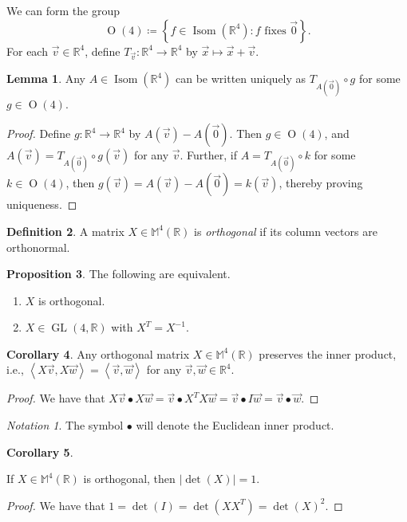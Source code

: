 \documentclass[10pt,letterpaper,cm]{nupset}
\theoremstyle{definition}
\newtheorem{definition}{Definition}[section]
\theoremstyle{theorem}
\newtheorem{lemma}[definition]{Lemma}
\newtheorem{cor}[definition]{Corollary}
\newtheorem{prop}[definition]{Proposition}
\theoremstyle{remark}
\newtheorem*{notation}{Notation}
\newcommand{\M}{\mathbb M}
\newcommand{\R}{\mathbb R}
\newcommand{\1}{\mathbf{1}}
\renewcommand{\v}{\vec v}
\newcommand{\w}{\vec w}
\newcommand{\x}{\vec x}
\newcommand{\0}{\vec {0}}
\DeclareMathOperator{\ORT}{O}
\DeclareMathOperator{\Isom}{Isom}
\DeclareMathOperator{\GL}{GL}
\begin{document}
We can form the group $$\ORT(4)\coloneqq \left\{f\in  \Isom(\R^4): f \text{ fixes } \0\right\}.$$ For each $\v\in \R^4$, define $T_{\v}:\R^4\to \R^4$ by $\x \mapsto \x + \v$.

\begin{lemma}\label{l1}
Any $A\in \Isom(\R^4)$ can be  written uniquely as $T_{A(\0)}\circ g$ for some $g\in \ORT(4)$. 
\end{lemma}
\begin{proof}
Define $g:\R^4\to \R^4$ by $A(\v)-A(\0)$. Then $g\in \ORT(4)$, and $A(\v)=T_{A(\0)}\circ g(\v)$ for any $\v$. Further, if $A=T_{A(\0)}\circ k$ for some $k\in \ORT(4)$, then $g(\v)=A(\v)-A(\0)=k(\v)$, thereby proving uniqueness. 
\end{proof}

\begin{definition} 
A matrix  $X\in \M^4(\R)$ is \textit{orthogonal} if its column vectors are orthonormal.
\end{definition}

\begin{prop} The following are equivalent.
\begin{enumerate}[label=(\alph*)]  
\item $X$ is orthogonal. 
\item $X\in \GL(4, \R)$ with $X^T=X^{-1}$.
\end{enumerate}
\end{prop}


\begin{cor}\label{preip} Any orthogonal matrix $X\in \M^4(\R)$ preserves the inner product, i.e., $\left\langle X\v, X\w\right\rangle=\left\langle \v, \w\right\rangle$ for any $\v, \w\in \R^4$.
\end{cor}

\begin{proof}
We have that $X\v \bullet X\w=\v\bullet X^TX\w=\v \bullet I\w =\v \bullet \w$.
\end{proof}

\smallskip

\begin{notation}
The symbol $\bullet$ will denote the Euclidean inner product.
\end{notation}

\begin{cor}\label{c2}

If $X\in \M^4(\R)$ is orthogonal, then $\left\lvert{\det(X)}\right\rvert=1$.
\end{cor}

\begin{proof}
We have that $1=\det(I)=\det(XX^T)=\det(X)^2$.
\end{proof}
\end{document}
